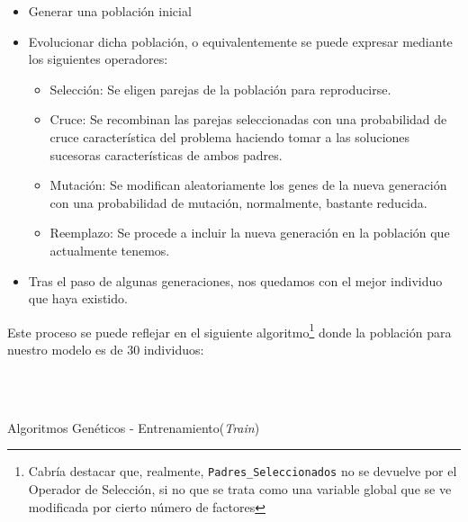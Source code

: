 \documentclass[a4paper, 11pt]{article}
\begin{document}
			\begin{itemize}
				\item Generar una población inicial
				\item Evolucionar dicha población, o equivalentemente se puede expresar mediante los
				siguientes operadores:
					\begin{itemize}
						\item Selección: Se eligen parejas de la población para reproducirse.
						\item Cruce: Se recombinan las parejas seleccionadas con una probabilidad de
						cruce característica del problema haciendo tomar a las soluciones sucesoras
						características de ambos padres.
						\item Mutación: Se modifican aleatoriamente los genes de la nueva generación
						con una probabilidad de mutación, normalmente, bastante reducida.
						\item Reemplazo: Se procede a incluir la nueva generación en la población
						que actualmente tenemos.
					\end{itemize}
				\item Tras el paso de algunas generaciones, nos quedamos con el mejor individuo que
				haya existido.
			\end{itemize}
			
			Este proceso se puede reflejar en el siguiente algoritmo\footnote{Cabría destacar que,
			realmente, \texttt{Padres\_Seleccionados} no se devuelve por el Operador de Selección, si
			no que se trata como una variable global que se ve modificada por cierto número de factores}
			donde la población para nuestro modelo es de 30 individuos:
			
			\begin{algorithm}[H]
				\begin{algorithmic}[1]
				\REQUIRE \ \\
						 \
			 
					\ENDIF
				\ENDFOR
				
					\ENDFOR
				\ENDWHILE
				
				\end{algorithmic}
			\caption{Algoritmos Genéticos - Entrenamiento(\textit{Train})}
			\label{GA-Train}
			\end{algorithm}
			
\end{document}
